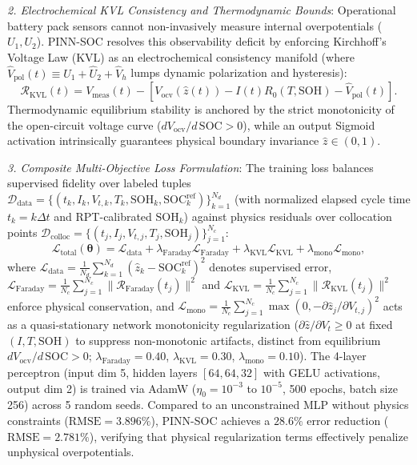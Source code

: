 \documentclass[balance,nocopyright,upint,varvw,hyphenate,barcolor=NavyBlue,nolists]{asmejour}
\begin{document}
\emph{2. Electrochemical KVL Consistency and Thermodynamic Bounds}: Operational battery pack sensors cannot non-invasively measure internal overpotentials ($U_1, U_2$). PINN-SOC resolves this observability deficit by enforcing Kirchhoff's Voltage Law (KVL) as an electrochemical consistency manifold (where $\hat{V}_{\text{pol}}(t) \equiv \hat{U}_1 + \hat{U}_2 + \hat{V}_h$ lumps dynamic polarization and hysteresis):
\begin{equation}\label{eqn:res_kvl}
\mathcal{R}_{\text{KVL}}(t) = V_{\text{meas}}(t) - \left[ V_{\text{ocv}}(\hat{z}(t)) - I(t) R_0(T, \text{SOH}) - \hat{V}_{\text{pol}}(t) \right].
\end{equation}
Thermodynamic equilibrium stability is anchored by the strict monotonicity of the open-circuit voltage curve ($d V_{\text{ocv}}/d\,\text{SOC} > 0$), while an output Sigmoid activation intrinsically guarantees physical boundary invariance $\hat{z} \in (0, 1)$.

\emph{3. Composite Multi-Objective Loss Formulation}: The training loss balances supervised fidelity over labeled tuples $\mathcal{D}_{\text{data}} = \{(t_k, I_k, V_{t,k}, T_k, \text{SOH}_k, \text{SOC}_k^{\text{ref}})\}_{k=1}^{N_d}$ (with normalized elapsed cycle time $t_k = k\Delta t$ and RPT-calibrated $\text{SOH}_k$) against physics residuals over collocation points $\mathcal{D}_{\text{colloc}} = \{(t_j, I_j, V_{t,j}, T_j, \text{SOH}_j)\}_{j=1}^{N_c}$:
\begin{equation}\label{eqn:pinn_loss}
\mathcal{L}_{\text{total}}(\boldsymbol{\theta}) = \mathcal{L}_{\text{data}} + \lambda_{\text{Faraday}} \mathcal{L}_{\text{Faraday}} + \lambda_{\text{KVL}} \mathcal{L}_{\text{KVL}} + \lambda_{\text{mono}} \mathcal{L}_{\text{mono}},
\end{equation}
where $\mathcal{L}_{\text{data}} = \allowbreak \tfrac{1}{N_d} \sum_{k=1}^{N_d} (\hat{z}_k - \text{SOC}_k^{\text{ref}})^2$ denotes supervised error, $\mathcal{L}_{\text{Faraday}} = \allowbreak \tfrac{1}{N_c} \sum_{j=1}^{N_c} \allowbreak \|\mathcal{R}_{\text{Faraday}}(t_j)\|^2$ and $\mathcal{L}_{\text{KVL}} = \allowbreak \tfrac{1}{N_c} \sum_{j=1}^{N_c} \allowbreak \|\mathcal{R}_{\text{KVL}}(t_j)\|^2$ enforce physical conservation, and $\mathcal{L}_{\text{mono}} = \allowbreak \tfrac{1}{N_c}\sum_{j=1}^{N_c} \allowbreak \max(0, -\partial \hat{z}_j/\partial V_{t,j})^2$ acts as a quasi-stationary network monotonicity regularization ($\partial \hat{z}/\partial V_t \ge 0$ at fixed $(I,T,\text{SOH})$ to suppress non-monotonic artifacts, distinct from equilibrium $d V_{\text{ocv}}/d\,\text{SOC} > 0$; $\lambda_{\text{Faraday}} = 0.40$, $\lambda_{\text{KVL}} = 0.30$, $\lambda_{\text{mono}} = 0.10$). The 4-layer perceptron (input dim 5, hidden layers $[64, 64, 32]$ with GELU activations, output dim 2) is trained via AdamW ($\eta_0 = 10^{-3}$ to $10^{-5}$, 500 epochs, batch size 256) across 5 random seeds. Compared to an unconstrained MLP without physics constraints ($\text{RMSE} = 3.896\%$), PINN-SOC achieves a $28.6\%$ error reduction ($\text{RMSE} = 2.781\%$), verifying that physical regularization terms effectively penalize unphysical overpotentials.
\end{document}
